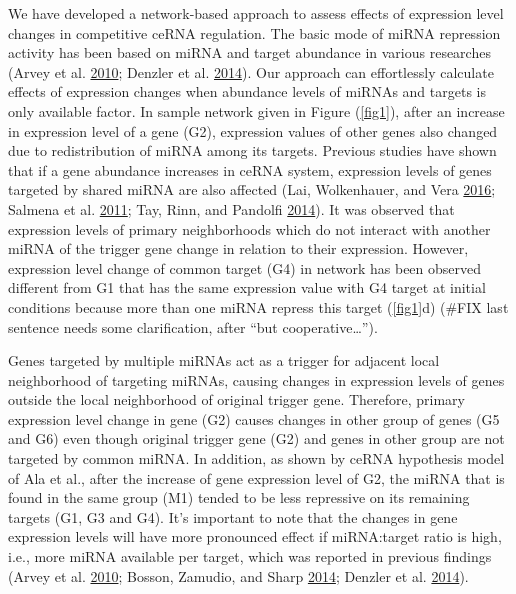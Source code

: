 \documentclass[]{article}
\begin{document}
We have developed a network-based approach to assess effects of
expression level changes in competitive ceRNA regulation. The basic mode
of miRNA repression activity has been based on miRNA and target
abundance in various researches (Arvey et al.
\protect\hyperlink{ref-arvey_target_2010}{2010}; Denzler et al.
\protect\hyperlink{ref-denzler_assessing_2014}{2014}). Our approach can
effortlessly calculate effects of expression changes when abundance
levels of miRNAs and targets is only available factor. In sample network
given in Figure (\autoref{fig1}), after an increase in expression level
of a gene (G2), expression values of other genes also changed due to
redistribution of miRNA among its targets. Previous studies have shown
that if a gene abundance increases in ceRNA system, expression levels of
genes targeted by shared miRNA are also affected (Lai, Wolkenhauer, and
Vera \protect\hyperlink{ref-lai_understanding_2016}{2016}; Salmena et
al. \protect\hyperlink{ref-salmena_cerna_2011}{2011}; Tay, Rinn, and
Pandolfi \protect\hyperlink{ref-tay_multilayered_2014}{2014}). It was
observed that expression levels of primary neighborhoods which do not
interact with another miRNA of the trigger gene change in relation to
their expression. However, expression level change of common target (G4)
in network has been observed different from G1 that has the same
expression value with G4 target at initial conditions because more than
one miRNA repress this target (\autoref{fig1}d) (\#FIX last sentence
needs some clarification, after ``but cooperative\ldots{}'').

Genes targeted by multiple miRNAs act as a trigger for adjacent local
neighborhood of targeting miRNAs, causing changes in expression levels
of genes outside the local neighborhood of original trigger gene.
Therefore, primary expression level change in gene (G2) causes changes
in other group of genes (G5 and G6) even though original trigger gene
(G2) and genes in other group are not targeted by common miRNA. In
addition, as shown by ceRNA hypothesis model of Ala et al., after the
increase of gene expression level of G2, the miRNA that is found in the
same group (M1) tended to be less repressive on its remaining targets
(G1, G3 and G4). It's important to note that the changes in gene
expression levels will have more pronounced effect if miRNA:target ratio
is high, i.e., more miRNA available per target, which was reported in
previous findings (Arvey et al.
\protect\hyperlink{ref-arvey_target_2010}{2010}; Bosson, Zamudio, and
Sharp \protect\hyperlink{ref-bosson_endogenous_2014}{2014}; Denzler et
al. \protect\hyperlink{ref-denzler_assessing_2014}{2014}). \href{}{}
\end{document}
